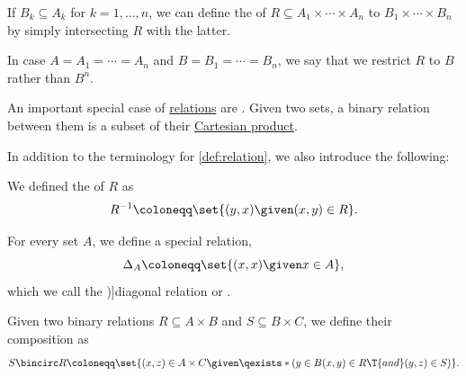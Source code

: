 \begin{comments}
\begin{definition}
\begin{thmenum}[series=def:relation]
     If \( B_k \subseteq A_k \) for \( k = 1, \ldots, n \), we can define the  of \( R \subseteq A_1 \times \cdots \times A_n \) to \( B_1 \times \cdots \times B_n \) by simply intersecting \( R \) with the latter.

    In case \( A = A_1 = \cdots = A_n \) and \( B = B_1 = \cdots = B_n \), we say that we restrict \( R \) to \( B \) rather than \( B^n \).
  \end{thmenum}
\end{definition}

\begin{definition}\label{def:binary_relation}
  An important special case of \hyperref[def:relation]{relations} are . Given two sets, a binary relation between them is a subset of their \hyperref[def:cartesian_product]{Cartesian product}.

  In addition to the terminology for \cref{def:relation}, we also introduce the following:
  \begin{thmenum}[series=def:binary_relation]
     We defined the  of \( R \) as
    \begin{equation*}
      R^{-1} \coloneqq \set{ (y, x) \given (x, y) \in R }.
    \end{equation*}

     For every set \( A \), we define a special relation,
    \begin{equation*}
      \Delta_A \coloneqq \set{ (x, x) \given x \in A },
    \end{equation*}
    which we call the \term[ru=диагональное (отношение) (\cite[def. 2.7]{Гуров2013ТеорияРешёток})]{diagonal relation} or .

     Given two binary relations \( R \subseteq A \times B \) and \( S \subseteq B \times C \), we define their composition as
    \begin{equation*}
      S \bincirc R \coloneqq \set{ (x, z) \in A \times C \given \qexists* ({y \in B} (x, y) \in R \T{and} (y, z) \in S) }.
    \end{equation*}
  \end{thmenum}


\end{definition}
\end{comments}
